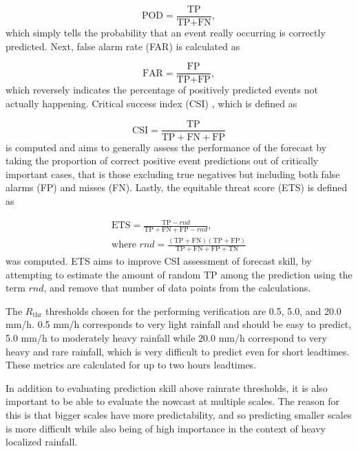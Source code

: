 \begin{equation}
	\text{POD} = \frac{\text{TP}}{\text{TP}+\text{FN}},
\end{equation} 
%
which simply tells the probability that an event really occurring is correctly predicted. Next, false alarm rate (FAR) \cite{schaefer_critical_1990} is calculated as 

\begin{equation}
	\text{FAR} = \frac{\text{FP}}{\text{TP}+\text{FP}},
\end{equation}
%
which reversely indicates the percentage of positively predicted events not actually happening. Critical success index (CSI) \cite{schaefer_critical_1990}, which is defined as 

\begin{equation}
	\text{CSI} = \frac{\text{TP}}{\text{TP}+\text{FN}+\text{FP}}
\end{equation}
%
is computed and aims to generally assess the performance of the forecast by taking the proportion of correct positive event predictions out of critically important cases, that is those excluding true negatives but including both false alarms (FP) and misses (FN). Lastly, the equitable threat score (ETS) \cite{hogan_equitability_2010} is defined as  

\begin{equation}
\begin{split}
\text{ETS} = \frac{\text{TP} - rnd}{\text{TP}+\text{FN}+\text{FP} - rnd}, \\
\text{where } rnd = \frac{(\text{TP}+\text{FN})(\text{TP}+\text{FP})}{\text{TP}+\text{FN}+\text{FP}+\text{TN}}
\end{split}
\end{equation}
%
was computed. ETS aims to improve CSI assessment of forecast skill, by attempting to estimate the amount of random TP among the prediction using the term $rnd$, and remove that number of data points from the calculations.

The $R_{\text{thr}}$ thresholds chosen for the performing verification are 0.5, 5.0, and 20.0 mm/h. 0.5 mm/h corresponds to very light rainfall and should be easy to predict, 5.0 mm/h to moderately heavy rainfall while 20.0 mm/h correspond to very heavy and rare rainfall, which is very difficult to predict even for short leadtimes. These metrics are calculated for up to two hours leadtimes. 

In addition to evaluating prediction skill above rainrate thresholds, it is also important to be able to evaluate the nowcast at multiple scales. The reason for this is that bigger scales have more predictability, and so predicting smaller scales is more difficult while also being of high importance in the context of heavy localized rainfall. 

